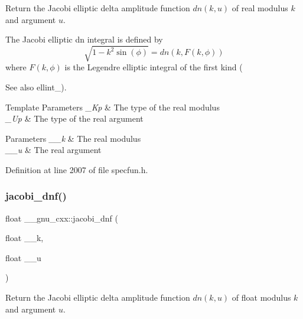 Return the Jacobi elliptic delta amplitude function $ dn(k,u) $ of real modulus $ k $ and argument $ u $.

The Jacobi elliptic {\ttfamily dn} integral is defined by \[ \sqrt{1 - k^2\sin(\phi)} = dn(k, F(k,\phi)) \] where $ F(k,\phi) $ is the Legendre elliptic integral of the first kind (\begin{DoxySeeAlso}{See also}
ellint\+\_).
\end{DoxySeeAlso}

\begin{DoxyTemplParams}{Template Parameters}
{\em \+\_\+\+Kp} & The type of the real modulus \\
\hline
{\em \+\_\+\+Up} & The type of the real argument \\
\hline
\end{DoxyTemplParams}

\begin{DoxyParams}{Parameters}
{\em \+\_\+\+\_\+k} & The real modulus \\
\hline
{\em \+\_\+\+\_\+u} & The real argument \\
\hline
\end{DoxyParams}


Definition at line 2007 of file specfun.\+h.

\mbox{\label{group__gnu__math__spec__func_gae96327d678adc6b5c4051f1c3649549a}} 
\subsubsection{\texorpdfstring{jacobi\+\_\+dnf()}{jacobi\_dnf()}}
{\footnotesize\ttfamily float \+\_\+\+\_\+gnu\+\_\+cxx\+::jacobi\+\_\+dnf (\begin{DoxyParamCaption}\item[{float}]{\+\_\+\+\_\+k,  }\item[{float}]{\+\_\+\+\_\+u }\end{DoxyParamCaption})\hspace{0.3cm}{\ttfamily [inline]}}

Return the Jacobi elliptic delta amplitude function $ dn(k,u) $ of {\ttfamily float} modulus $ k $ and argument $ u $.

